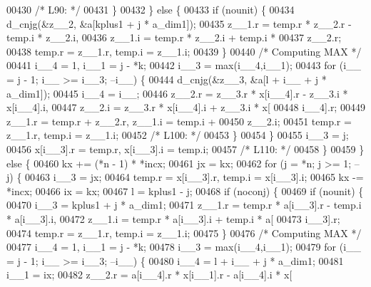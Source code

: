 \begin{DoxyCode}
00430 \textcolor{comment}{/* L90: */}
00431             \}
00432             \} \textcolor{keywordflow}{else} \{
00433             \textcolor{keywordflow}{if} (nounit) \{
00434                 d\_cnjg(&z\_\_2, &a[kplus1 + j * a\_dim1]);
00435                 z\_\_1.r = temp.r * z\_\_2.r - temp.i * z\_\_2.i, 
00436                     z\_\_1.i = temp.r * z\_\_2.i + temp.i * 
00437                     z\_\_2.r;
00438                 temp.r = z\_\_1.r, temp.i = z\_\_1.i;
00439             \}
00440 \textcolor{comment}{/* Computing MAX */}
00441             i\_\_4 = 1, i\_\_1 = j - *k;
00442             i\_\_3 = max(i\_\_4,i\_\_1);
00443             \textcolor{keywordflow}{for} (i\_\_ = j - 1; i\_\_ >= i\_\_3; --i\_\_) \{
00444                 d\_cnjg(&z\_\_3, &a[l + i\_\_ + j * a\_dim1]);
00445                 i\_\_4 = i\_\_;
00446                 z\_\_2.r = z\_\_3.r * x[i\_\_4].r - z\_\_3.i * x[i\_\_4].i, 
00447                     z\_\_2.i = z\_\_3.r * x[i\_\_4].i + z\_\_3.i * x[
00448                     i\_\_4].r;
00449                 z\_\_1.r = temp.r + z\_\_2.r, z\_\_1.i = temp.i + 
00450                     z\_\_2.i;
00451                 temp.r = z\_\_1.r, temp.i = z\_\_1.i;
00452 \textcolor{comment}{/* L100: */}
00453             \}
00454             \}
00455             i\_\_3 = j;
00456             x[i\_\_3].r = temp.r, x[i\_\_3].i = temp.i;
00457 \textcolor{comment}{/* L110: */}
00458         \}
00459         \} \textcolor{keywordflow}{else} \{
00460         kx += (*n - 1) * *incx;
00461         jx = kx;
00462         \textcolor{keywordflow}{for} (j = *n; j >= 1; --j) \{
00463             i\_\_3 = jx;
00464             temp.r = x[i\_\_3].r, temp.i = x[i\_\_3].i;
00465             kx -= *incx;
00466             ix = kx;
00467             l = kplus1 - j;
00468             \textcolor{keywordflow}{if} (noconj) \{
00469             \textcolor{keywordflow}{if} (nounit) \{
00470                 i\_\_3 = kplus1 + j * a\_dim1;
00471                 z\_\_1.r = temp.r * a[i\_\_3].r - temp.i * a[i\_\_3].i, 
00472                     z\_\_1.i = temp.r * a[i\_\_3].i + temp.i * a[
00473                     i\_\_3].r;
00474                 temp.r = z\_\_1.r, temp.i = z\_\_1.i;
00475             \}
00476 \textcolor{comment}{/* Computing MAX */}
00477             i\_\_4 = 1, i\_\_1 = j - *k;
00478             i\_\_3 = max(i\_\_4,i\_\_1);
00479             \textcolor{keywordflow}{for} (i\_\_ = j - 1; i\_\_ >= i\_\_3; --i\_\_) \{
00480                 i\_\_4 = l + i\_\_ + j * a\_dim1;
00481                 i\_\_1 = ix;
00482                 z\_\_2.r = a[i\_\_4].r * x[i\_\_1].r - a[i\_\_4].i * x[

\end{DoxyCode}
